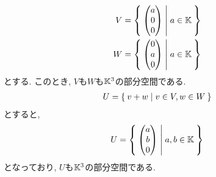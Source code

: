 \begin{example}
  \begin{align*}
    V&=\Set{\begin{pmatrix}a\\0\\0\end{pmatrix}|a\in\mathbb{K}}\\
    W&=\Set{\begin{pmatrix}0\\a\\0\end{pmatrix}|a\in\mathbb{K}}
  \end{align*}
  とする.
  このとき, $V$も$W$も$\mathbb{K}^3$の部分空間である.
  \begin{align*}
    U=\Set{v+w|v\in V, w\in W}
  \end{align*}
  とすると,
  \begin{align*}
    U&=\Set{\begin{pmatrix}a\\b\\0\end{pmatrix}|a,b\in\mathbb{K}}\\
  \end{align*}
  となっており, $U$も$\mathbb{K}^3$の部分空間である.
\end{example}

